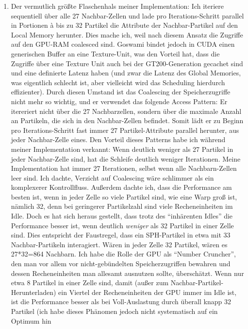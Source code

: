 \begin{enumerate}
		\item 
		\label{enum:goswamiAccessPattern}
		Der vermutlich größte Flaschenhals meiner Implementation:
		Ich iteriere sequentiell über alle 27 Nachbar-Zellen und lade pro Iterations-Schritt parallel in Portionen
		à bis zu 32 Partikel die Attribute der Nachbar-Partikel auf den Local Memory herunter.
		Dies mache ich, weil nach diesem Ansatz die Zugriffe auf den GPU-RAM coalesced sind.
		Goswami bindet jedoch in CUDA einen generischen Buffer an eine Texture-Unit,
		was den Vorteil hat, dass die Zugriffe über eine Texture Unit auch bei der GT200-Generation 
		gecachet sind und eine definierte Latenz 
		haben (und zwar die Latenz des Global Memories, was eigentlich schlecht ist, aber vielleicht wird das Scheduling 
		hierdurch effizienter). Durch diesen Umstand ist das Coalescing der Speicherzugriffe nicht mehr so wichtig,
		und er verwendet das folgende  Access Pattern: Er itereriert nicht über die 27 Nachbarzellen, sondern über die
		maximale Anzahl an Partikeln, die sich in den Nachbar-Zellen befindet. 
		Somit lädt er zu Beginn pro Iterations-Schritt fast immer 27 Partikel-Attribute parallel herunter, 
		aus jeder Nachbar-Zelle eines.
		Den Vorteil dieses Patterns habe ich während meiner Implementation verkannt: Wenn deutlich weniger
		als 27 Partikel in jeder Nachbar-Zelle sind, hat die Schleife deutlich weniger Iterationen. 
		Meine Implementation hat immer 27 Iterationen, selbst wenn alle Nachbarn-Zellen leer sind.
		Ich dachte, Verzicht auf Coalescing wäre schlimmer als ein komplexerer Kontrollfluss. 
		Außerdem dachte ich, dass die Performance am besten ist, wenn in jeder Zelle so viele Partikel sind,
		wie eine Warp groß ist, nämlich 32, denn bei geringerer Partikelzahl sind viele Recheneinheiten im Idle.
		Doch es hat sich heraus gestellt, dass trotz des "`inhärenten Idles"' die Performance besser ist, wenn
		deutlich \emph{weniger} als 32 Partikel in einer Zelle sind. Dies entspricht der Faustregel,
		dass ein SPH-Partikel in etwa mit 33 Nachbar-Partikeln interagiert. Wären in jeder Zelle 32 Partikel,
		wären es 27*32=864 Nachbarn. Ich habe die Rolle der GPU als "`Number Cruncher"', den man vor allem
		vor nicht-gebündelten Speicherzugriffen bewahren und dessen Recheneinheiten man allesamt ausnutzen sollte,
		überschätzt.
		Wenn nur etwa 8 Partikel in einer Zelle sind, damit (außer zum Nachbar-Partikel-Herunterladen)
		ein Viertel der Recheneinheiten der GPU immer im Idle ist, ist die Performance besser als bei Voll-Auslastung
		durch überall knapp 32 Partikel (ich habe dieses Phänomen jedoch nicht systematisch auf ein Optimum hin 	

\end{enumerate}
